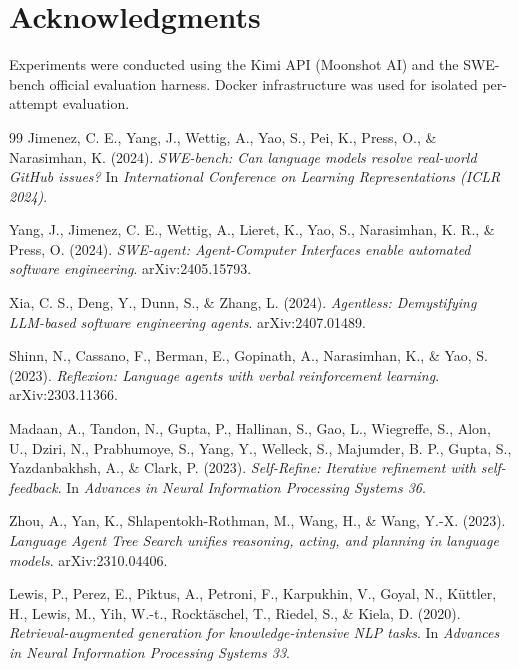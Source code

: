 \documentclass[runningheads]{llncs}
\begin{document}
\section*{Acknowledgments}

Experiments were conducted using the Kimi API (Moonshot AI) and the SWE-bench official evaluation harness. Docker infrastructure was used for isolated per-attempt evaluation.

\begin{thebibliography}{99}
Jimenez, C. E., Yang, J., Wettig, A., Yao, S., Pei, K., Press, O., \& Narasimhan, K. (2024).
\newblock \textit{SWE-bench: Can language models resolve real-world GitHub issues?}
\newblock In \textit{International Conference on Learning Representations (ICLR 2024)}.

Yang, J., Jimenez, C. E., Wettig, A., Lieret, K., Yao, S., Narasimhan, K. R., \& Press, O. (2024).
\newblock \textit{SWE-agent: Agent-Computer Interfaces enable automated software engineering}.
\newblock arXiv:2405.15793.

Xia, C. S., Deng, Y., Dunn, S., \& Zhang, L. (2024).
\newblock \textit{Agentless: Demystifying LLM-based software engineering agents}.
\newblock arXiv:2407.01489.

Shinn, N., Cassano, F., Berman, E., Gopinath, A., Narasimhan, K., \& Yao, S. (2023).
\newblock \textit{Reflexion: Language agents with verbal reinforcement learning}.
\newblock arXiv:2303.11366.

Madaan, A., Tandon, N., Gupta, P., Hallinan, S., Gao, L., Wiegreffe, S., Alon, U., Dziri, N., Prabhumoye, S., Yang, Y., Welleck, S., Majumder, B. P., Gupta, S., Yazdanbakhsh, A., \& Clark, P. (2023).
\newblock \textit{Self-Refine: Iterative refinement with self-feedback}.
\newblock In \textit{Advances in Neural Information Processing Systems 36}.

Zhou, A., Yan, K., Shlapentokh-Rothman, M., Wang, H., \& Wang, Y.-X. (2023).
\newblock \textit{Language Agent Tree Search unifies reasoning, acting, and planning in language models}.
\newblock arXiv:2310.04406.

Lewis, P., Perez, E., Piktus, A., Petroni, F., Karpukhin, V., Goyal, N., K\"uttler, H., Lewis, M., Yih, W.-t., Rockt\"aschel, T., Riedel, S., \& Kiela, D. (2020).
\newblock \textit{Retrieval-augmented generation for knowledge-intensive NLP tasks}.
\newblock In \textit{Advances in Neural Information Processing Systems 33}.


\end{thebibliography}
\end{document}
